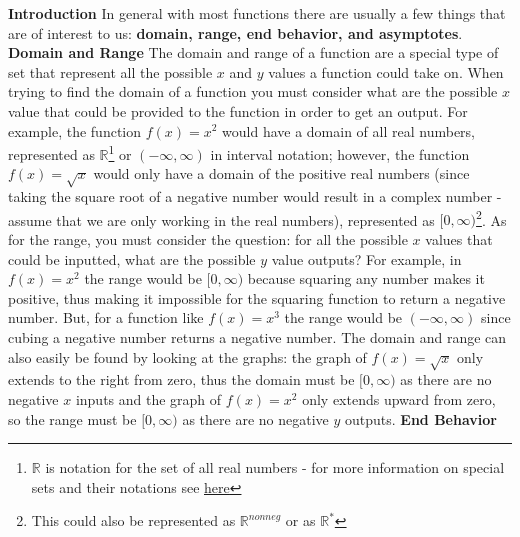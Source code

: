 \documentclass[addpoints]{exam}
\begin{document}
  
  \begin{tcolorbox}[breakable, title=GENERAL FUNCTIONS, colframe=black, sharp corners, colback=white, colbacktitle=white, coltitle=black]
    \Large \textbf{Introduction} 
    \newline \normalsize
    In general with most functions there are usually a few things that are of interest to us: \textbf{domain, range, end behavior, and asymptotes}.
    \vspace{0.1in}
    \newline \Large \textbf{Domain and Range}
    \newline \normalsize The domain and range of a function are a special type of set that represent all the possible $x$ and $y$ values a function could take on. When trying to find the domain of a function you must consider what are the possible $x$ value that could be provided to the function in order to get an output. For example, the function $f(x)=x^2$ would have a domain of all real numbers, represented as $\mathbb{R}$\footnote{$\mathbb{R}$ is notation for the set of all real numbers - for more information on special sets and their notations see \href{https://www.mathsisfun.com/sets/number-types.html}{\underline{here}}} or $(-\infty, \infty)$ in interval notation; however, the function $f(x)=\sqrt{x}$ would only have a domain of the positive real numbers (since taking the square root of a negative number would result in a complex number - assume that we are only working in the real numbers), represented as $[0, \infty)$\footnote{This could also be represented as $\mathbb{R}^{\textit{nonneg}}$ or as $\mathbb{R}^{*}$}. As for the range, you must consider the question: for all the possible $x$ values that could be inputted, what are the possible $y$ value outputs? For example, in $f(x)=x^2$ the range would be $[0, \infty)$ because squaring any number makes it positive, thus making it impossible for the squaring function to return a negative number. But, for a function like $f(x)=x^3$ the range would be $(-\infty, \infty)$ since cubing a negative number returns a negative number. The domain and range can also easily be found by looking at the graphs: the graph of $f(x)=\sqrt{x}$ only extends to the right from zero, thus the domain must be $[0, \infty)$ as there are no negative $x$ inputs and the graph of $f(x)=x^2$ only extends upward from zero, so the range must be $[0, \infty)$ as there are no negative $y$ outputs.
  \vspace{0.1in}
  \newline\Large\textbf{End Behavior}

\end{tcolorbox}
\end{document}
